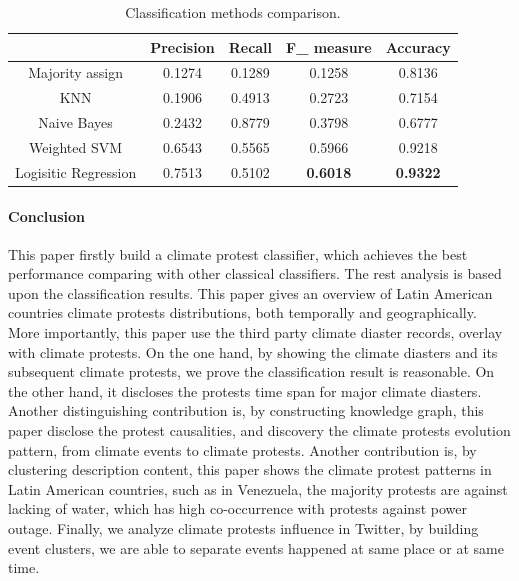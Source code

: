 \documentclass[9pt,twocolumn,twoside]{pnas-new}
\begin{document}
{\begin{table}[!ht]
\small
\caption{Classification methods comparison.}
\vspace{0.5em}
\centering
\begin{tabular}{|c | c | c | c | c |}
\hline
 & \textbf{Precision} & \textbf{Recall} & \textbf{F\_ measure} & \textbf{Accuracy}  \\ [1ex]
\hline
Majority assign   &  0.1274  &  0.1289 &  0.1258 &  0.8136  \\[1ex]
\hline
KNN &  0.1906  & 0.4913 &  0.2723 &  0.7154  \\[1ex]
\hline
Naive Bayes &  0.2432 & 0.8779 &  0.3798 &  0.6777  \\[1ex]
\hline
Weighted SVM &  0.6543 &  0.5565 & 0.5966 &  0.9218  \\[1ex]
\hline
Logisitic Regression & 0.7513 &  0.5102 &  \textbf{0.6018}&  \textbf{0.9322}  \\[1ex]
\hline
\end{tabular}
\label{table:comparision}
\end{table}


\paragraph{Conclusion} This paper firstly build a climate protest classifier, which achieves the best performance comparing with other classical classifiers. The rest analysis is based upon the classification results. This paper gives an overview of Latin American countries climate protests distributions, both temporally and geographically. More importantly, this paper use the third party climate diaster records, overlay with climate protests. On the one hand, by showing the climate diasters and its subsequent climate protests, we prove the classification result is reasonable. On the other hand, it discloses the protests time span for major climate diasters. Another distinguishing contribution is, by constructing knowledge graph, this paper disclose the protest causalities, and discovery the climate protests evolution pattern, from climate events to climate protests. Another contribution is, by clustering description content, this paper shows the climate protest patterns in Latin American countries, such as in Venezuela, the majority protests are against lacking of water, which has high co-occurrence with protests against power outage. Finally, we analyze climate protests influence in Twitter, by building event clusters, we are able to separate events happened at same place or at same time. 

}
\end{document}
